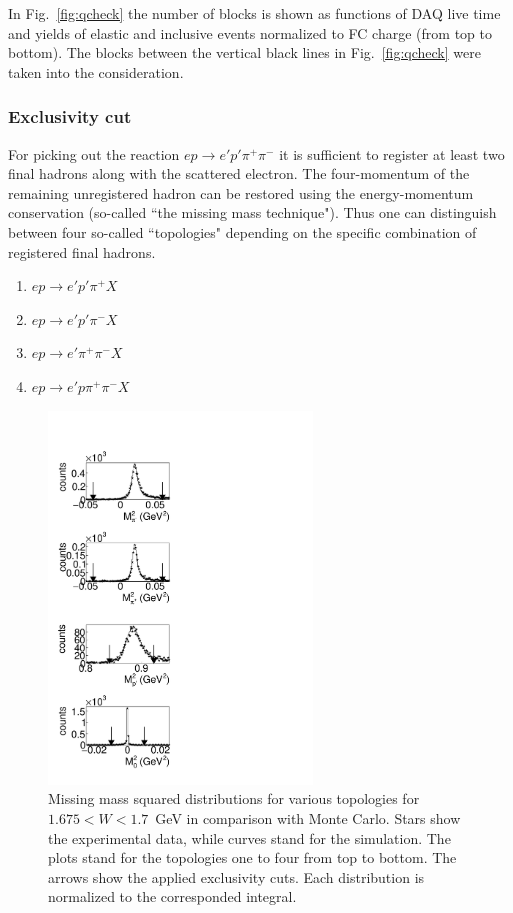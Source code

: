 \documentclass[prc,twocolumn,superscriptaddress,showpacs,amssymb,amsmath,amsfonts,linenumbers,aps]{revtex4-1}
\begin{document}
In Fig.~\ref{fig:qcheck} the number of blocks is shown as functions of DAQ live time and  yields of elastic and inclusive events normalized to FC charge (from top to bottom). 
The blocks between the vertical black  lines in Fig.~\ref{fig:qcheck} were taken into the consideration.






\subsubsection{Exclusivity cut}



For picking out the reaction $e p \rightarrow e' p' \pi^{+} \pi^{-} $ it is sufficient to register at least two final hadrons along with the scattered electron. The four-momentum of the remaining unregistered hadron can be restored using the energy-momentum conservation (so-called ``the missing mass technique"). Thus one can distinguish between four so-called ``topologies" depending on the specific combination of registered final hadrons. 

\begin{enumerate}
\item $e p \rightarrow e' p' \pi^{+} X$
\item $e p \rightarrow e' p' \pi^{-} X$
\item $e p \rightarrow e' \pi^{+} \pi^{-} X$
\item $e p \rightarrow e' p \pi^{+} \pi^{-} X$
\end{enumerate}


\begin{figure}[htp!]
\begin{center}
 \includegraphics[width=7cm,keepaspectratio]{pictures/excl_cut/miss_mass.pdf} 
\vspace{-0.1cm}
\caption{
Missing mass squared distributions for various topologies for $1.675 < W < 1.7$~GeV in comparison with Monte Carlo. Stars show the experimental data, while curves stand for the simulation.
The plots stand for the topologies one to four from top to bottom. The arrows show the applied exclusivity cuts. 
Each distribution is normalized to the corresponded integral.}
\label{fig:miss_mass}
\end{center}
\end{figure}
\end{document}
